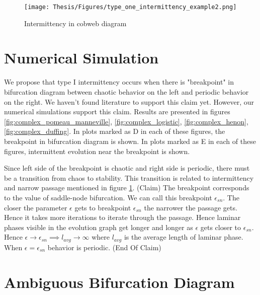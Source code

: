 \begin{figure}[!h]
    \centering
    \texttt{[image: Thesis/Figures/type\_one\_intermittency\_example2.png]}
    \caption{Intermittency in cobweb diagram}
    \label{fig:intermittent_cobweb_example}
\end{figure}

\section{Numerical Simulation}
We propose that type I intermittency occurs when there is "breakpoint" in bifurcation diagram between chaotic behavior on the left and periodic behavior on the right.
We haven't found literature to support this claim yet.
However, our numerical simulations support this claim.
Results are presented in figures \ref{fig:complex_pomeau_manneville}, \ref{fig:complex_logistic}, \ref{fig:complex_henon}, \ref{fig:complex_duffing}.
In plots marked as D in each of these figures, the breakpoint in bifurcation diagram is shown.
In plots marked as E in each of these figures, intermittent evolution near the breakpoint is shown.
\par
Since left side of the breakpoint is chaotic and right side is periodic, there must be a transition from chaos to stability.
This transition is related to intermittency and narrow passage mentioned in figure \ref{fig:intermittent_cobweb_example}.
(Claim) The breakpoint corresponds to the value of saddle-node bifurcation.
We can call this breakpoint $\epsilon_{sn}$.
The closer the parameter $\epsilon$ gets to breakpoint $\epsilon_{sn}$ the narrower the passage gets.
Hence it takes more iterations to iterate through the passage.
Hence laminar phases visible in the evolution graph get longer and longer as $\epsilon$ gets closer to $\epsilon_{sn}$.
Hence $\epsilon \rightarrow \epsilon_{sn} \implies l_{avg} \rightarrow \infty$ where $l_{avg}$ is the average length of laminar phase.
When $\epsilon = \epsilon_{sn}$ behavior is periodic.
(End Of Claim)

\section{Ambiguous Bifurcation Diagram}

\endinput